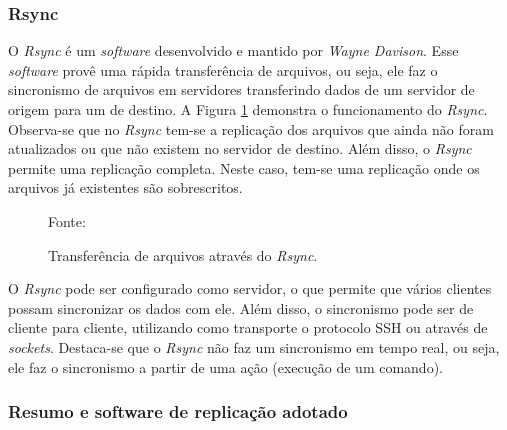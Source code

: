\subsubsection{Rsync}
\label{section:rsync}
O \textit{Rsync} \cite{rsync} é um \textit{software} desenvolvido e mantido por \textit{Wayne Davison}. Esse \textit{software} provê uma rápida
transferência de arquivos, ou seja, ele faz o sincronismo de arquivos em servidores transferindo dados de um servidor de origem para um de destino.
A Figura \ref{fig:rsync} demonstra o funcionamento do \textit{Rsync}. Observa-se que no \textit{Rsync} tem-se a replicação dos arquivos que
ainda não foram atualizados ou que não existem no servidor de destino. Além disso, o \textit{Rsync} permite uma replicação completa. Neste caso,
tem-se uma replicação onde os arquivos já existentes são sobrescritos.

\begin{figure}[h!]
 \centering
 \caption{Transferência de arquivos através do \textit{Rsync}.}
 Fonte: \citet{lopez2012}
 \label{fig:rsync}
\end{figure}


O \textit{Rsync} pode ser configurado como servidor, o que permite que vários clientes possam sincronizar os dados com ele. 
Além disso, o sincronismo pode ser de cliente para cliente, utilizando como transporte o protocolo \ac{SSH} ou através de \textit{sockets}.
Destaca-se que o \textit{Rsync} não faz um sincronismo em tempo real, ou seja, ele faz o sincronismo a partir de uma ação (execução de um comando).


\subsubsection{Resumo e software de replicação adotado}
\label{section:replicacaoescolhido}

